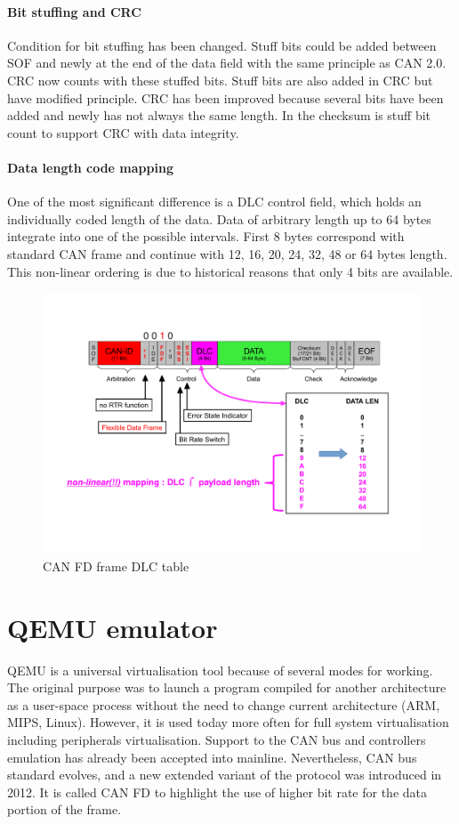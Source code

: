\documentclass{ctuthesis}
\begin{document}
   \subsubsection{Bit stuffing and CRC}
    Condition for bit stuffing has been changed. Stuff bits could be added between SOF and newly at the end of the data field with the same principle as CAN 2.0. CRC now counts with these stuffed bits. Stuff bits are also added in CRC but have modified principle. CRC has been improved because several bits have been added and newly has not always the same length. In the checksum is stuff bit count to support CRC with data integrity.
   \subsubsection{Data length code mapping}
    One of the most significant difference is a DLC control field, which holds an individually coded length of the data. Data of arbitrary length up to 64 bytes integrate into one of the possible intervals. First 8 bytes correspond with standard CAN frame and continue with 12, 16, 20, 24, 32, 48 or 64 bytes length. This non-linear ordering is due to historical reasons that only 4 bits are available.
    \begin{figure}[H]
    \includegraphics[width=1\textwidth]{agl2017-socketcan-can_fd_dlc}
    \caption{CAN FD frame DLC table \cite{canfd_dlc}}
    \end{figure}
 
\chapter{QEMU emulator}
 QEMU is a universal virtualisation tool because of several modes for working. The original purpose was to launch a program compiled for another architecture as a user-space process without the need to change current architecture (ARM, MIPS, Linux). However, it is used today more often for full system virtualisation including peripherals virtualisation. Support to the CAN bus and controllers emulation has already been accepted into mainline. Nevertheless, CAN bus standard evolves, and a new extended variant of the protocol was introduced in 2012. It is called CAN FD to highlight the use of higher bit rate for the data portion of the frame.
\end{document}
